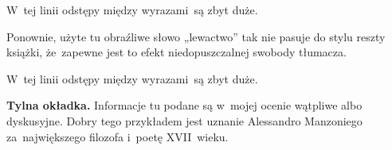\documentclass[a4paper,11pt]{article}
\begin{document}
\vspace{\spaceFour}





\start {} W~tej linii odstępy między wyrazami~są zbyt
duże.

\vspace{\spaceFour}





\start {} Ponownie, użyte tu obraźliwe słowo „lewactwo”
tak nie pasuje do stylu reszty książki, że~zapewne jest to efekt
niedopuszczalnej swobody tłumacza.

\vspace{\spaceFour}





\start {} W~tej linii odstępy między wyrazami~są zbyt
duże.

\vspace{\spaceFour}





\start \textbf{Tylna okładka.} Informacje tu podane są w~mojej ocenie
wątpliwe albo dyskusyjne. Dobry tego przykładem jest uznanie
Alessandro Manzoniego za~największego filozofa i~poetę XVII~wieku.

\vspace{\spaceFour}





\end{document}
